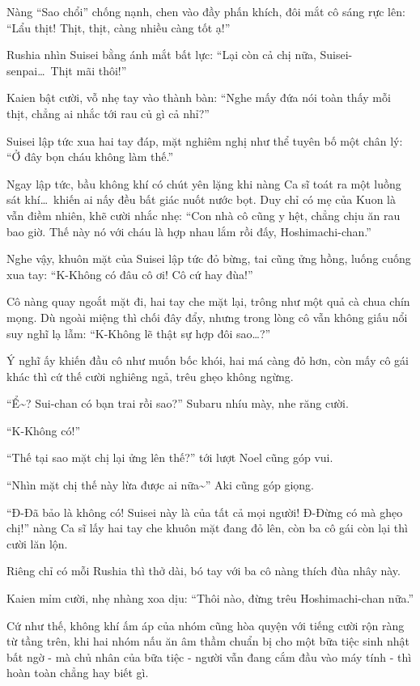 \documentclass[../main.tex]{subfiles}
\begin{document}
Nàng ``Sao chổi'' chống nạnh, chen vào đầy phấn khích, đôi mắt cô sáng rực lên: ``Lẩu thịt! Thịt, thịt, càng nhiều càng tốt ạ!''

Rushia nhìn Suisei bằng ánh mắt bất lực: ``Lại còn cả chị nữa, Suisei-senpai\dots\ Thịt mãi thôi!''

Kaien bật cười, vỗ nhẹ tay vào thành bàn: ``Nghe mấy đứa nói toàn thấy mỗi thịt, chẳng ai nhắc tới rau củ gì cả nhỉ?''

Suisei lập tức xua hai tay đáp, mặt nghiêm nghị như thể tuyên bố một chân lý: ``Ở đây bọn cháu không làm thế.''

Ngay lập tức, bầu không khí có chút yên lặng khi nàng Ca sĩ toát ra một luồng sát khí\dots\ khiến ai nấy đều bất giác nuốt nước bọt. Duy chỉ có mẹ của Kuon là vẫn điềm nhiên, khẽ cười nhắc nhẹ: ``Con nhà cô cũng y hệt, chẳng chịu ăn rau bao giờ. Thế này nó với cháu là hợp nhau lắm rồi đấy, Hoshimachi-chan.''

Nghe vậy, khuôn mặt của Suisei lập tức đỏ bừng, tai cũng ửng hồng, luống cuống xua tay: ``K-Không có đâu cô ơi! Cô cứ hay đùa!''

Cô nàng quay ngoắt mặt đi, hai tay che mặt lại, trông như một quả cà chua chín mọng. Dù ngoài miệng thì chối đây đẩy, nhưng trong lòng cô vẫn không giấu nổi suy nghĩ lạ lẫm: ``K-Không lẽ thật sự hợp đôi sao\dots?''

Ý nghĩ ấy khiến đầu cô như muốn bốc khói, hai má càng đỏ hơn, còn mấy cô gái khác thì cứ thế cười nghiêng ngả, trêu ghẹo không ngừng.

``Ể\~{}? Sui-chan có bạn trai rồi sao?'' Subaru nhíu mày, nhe răng cười.

``K-Không có!''

``Thế tại sao mặt chị lại ửng lên thế?'' tới lượt Noel cũng góp vui.

``Nhìn mặt chị thế này lừa được ai nữa\~{}'' Aki cũng góp giọng.

``Đ-Đã bảo là không có! Suisei này là của tất cả mọi người! Đ-Đừng có mà ghẹo chị!'' nàng Ca sĩ lấy hai tay che khuôn mặt đang đỏ lên, còn ba cô gái còn lại thì cười lăn lộn.

Riêng chỉ có mỗi Rushia thì thở dài, bó tay với ba cô nàng thích đùa nhây này.

Kaien mỉm cười, nhẹ nhàng xoa dịu: ``Thôi nào, đừng trêu Hoshimachi-chan nữa.''

Cứ như thế, không khí ấm áp của nhóm cũng hòa quyện với tiếng cười rộn ràng từ tầng trên, khi hai nhóm nấu ăn âm thầm chuẩn bị cho một bữa tiệc sinh nhật bất ngờ - mà chủ nhân của bữa tiệc - người vẫn đang cắm đầu vào máy tính - thì hoàn toàn chẳng hay biết gì.
\end{document}
